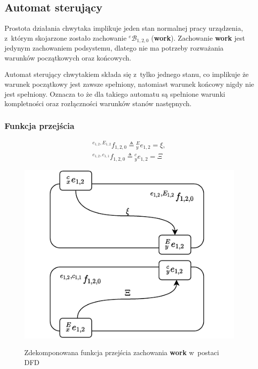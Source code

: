 \subsection{Automat sterujący}
Prostota działania chwytaka implikuje jeden stan normalnej pracy urządzenia, z~którym skojarzone zostało zachowanie ${}^{e}\mathcal{B}_{1,2,0}$ (\textbf{work}). Zachowanie \textbf{work} jest jedynym zachowaniem podsystemu, dlatego nie ma potrzeby rozważania warunków początkowych oraz końcowych. 

Automat sterujący chwytakiem składa się z~tylko jednego stanu, co implikuje że warunek początkowy jest zawsze spełniony, natomiast warunek końcowy nigdy nie jest spełniony. Oznacza to że dla takiego automatu są spełnione warunki kompletności oraz rozłączności warunków stanów następnych.

\subsubsection{Funkcja przejścia}
\begin{equation}
    \begin{gathered}
        {}^{e_{1,2}, E_{1,2}}f_{1,2,0} \triangleq {}^{E}_{y}e_{1,2} = \xi,\\
        {}^{e_{1,2}, c_{1,1}}f_{1,2,0} \triangleq {}^{c}_{y}e_{1,2} = \Xi
    \end{gathered}
\end{equation}

\begin{figure}
    \centering
    \includegraphics[width=\columnwidth]{figures/ISR-ve-gripper-fp-work.pdf}
    \label{fig:ve-gripper-fp-work}
    \caption{Zdekomponowana funkcja przejścia zachowania \textbf{work} w~postaci DFD}
\end{figure}


